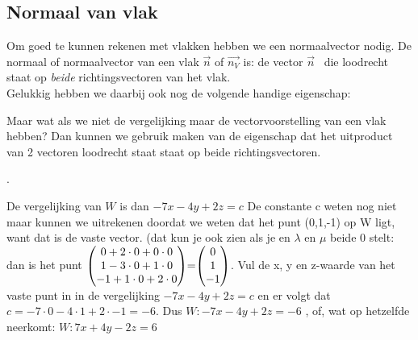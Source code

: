 \subsection{Normaal van vlak}

Om goed te kunnen rekenen met vlakken hebben we een normaalvector nodig.
\label{vlaknormaal}
{De normaal of normaalvector van een vlak $\vec{n}$ of  $\overrightarrow{n_{V}}$ is:
	de vector $ \vec{n} $  \ die loodrecht staat op \textit{beide} richtingsvectoren van het vlak. \\ 
	Gelukkig hebben we daarbij ook nog de volgende handige eigenschap:}


Maar wat als we niet de vergelijking maar de vectorvoorstelling van een vlak hebben? Dan kunnen we gebruik maken van de eigenschap dat  het uitproduct van 2 vectoren loodrecht staat staat op beide richtingsvectoren. 

.


De vergelijking van $ W $ is dan  $ -7x-4y+2z = c $ De constante c weten nog niet maar kunnen we uitrekenen doordat we weten dat het punt (0,1,-1) op W ligt, want dat is de vaste vector. (dat kun je ook zien als je en $ \lambda $  en $ \mu $  beide 0 stelt: dan is het punt $\vecdrie{0 +2\cdot0 +0\cdot0}{1 -3\cdot0 +1\cdot0}{-1 + 1\cdot0 + 2\cdot0} = \vecdrie{0}{1}{-1} $.
Vul de x, y en z-waarde van het vaste punt  in in de vergelijking $ -7x-4y+2z = c $ en er volgt dat $c = -7\cdot0-4\cdot1+2\cdot-1 = -6$. Dus $ W: -7x-4y+2z = -6 $ , of, wat op hetzelfde neerkomt:  $ W: 7x+4y-2z = 6 $

